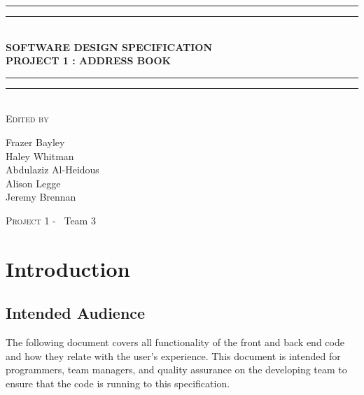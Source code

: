 \documentclass[a4paper, 11pt]{article}
\newlength{\drop}
\begin{document}
	
	\begin{titlepage}
		\textheight
		\centering
		\vspace*{\baselineskip}
		\rule{\textwidth}{1.6pt}\vspace*{-\baselineskip}\vspace*{2pt}
		\rule{\textwidth}{0.4pt}\\[\baselineskip]
		{\LARGE \textbf{SOFTWARE DESIGN SPECIFICATION \\ PROJECT 1 : ADDRESS BOOK}}\\[0.2\baselineskip]
		\rule{\textwidth}{0.4pt}\vspace*{-\baselineskip}\vspace{3.2pt}
		\rule{\textwidth}{1.6pt}\\[\baselineskip]
		\scshape
		\vspace*{2\baselineskip}
		Edited by \\[\baselineskip]
		{\Large Frazer Bayley \\ Haley Whitman \\ Abdulaziz Al-Heidous \\ Alison Legge \\ Jeremy Brennan\par}

		\vfill
		{\scshape \LARGE Project 1 -} \        {\LARGE Team 3}\par
	\end{titlepage}


\tableofcontents
\vspace*{10\baselineskip}
\begin{versionhistory}

	
\end{versionhistory}
\pagebreak

\section{Introduction}
\subsection{Intended Audience}
The following document covers all functionality of the front and back end code and how they relate with the user's experience. This document is intended for programmers, team managers, and quality assurance on the developing team to ensure that the code is running to this specification.
\end{document}
